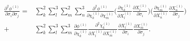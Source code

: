 \documentclass[12pt]{amsart}
\begin{document}
\begin{equation}
  \label{eq:derivative_2_5}
  \begin{split}
    \frac{\partial^2\phi^{(1)}}{\partial\sigma_i\partial\sigma_j}=&\sum_k^2 \sum_l^3 \sum_m^2 \sum_n^3 \frac{\partial^2\phi^{(1)}}{\partial\chi^{(1)}_k\partial\chi^{(1)}_m} \bigg( \frac{\partial\chi^{(1)}_k}{\partial X^{(1)}_l}    \frac{\partial X^{(1)}_l}{\partial \sigma_i}\bigg)  \bigg( \frac{\partial\chi^{(1)}_m}{\partial X^{(1)}_n}    \frac{\partial X^{(1)}_n}{\partial \sigma_j}\bigg)\\
    +&\sum_k^2 \sum_l^3 \sum_m^3 \frac{\partial\phi^{(1)} }{\partial\chi^{(1)}_k}     \frac{\partial^2\chi^{(1)}_k}{\partial X^{(1)}_l \partial  X^{(1)}_m}   \frac{\partial X^{(1)}_l}{\partial\sigma_i}    \frac{\partial X^{(1)}_m}{\partial\sigma_j}.
  \end{split}
\end{equation}

\newpage


\end{document}
